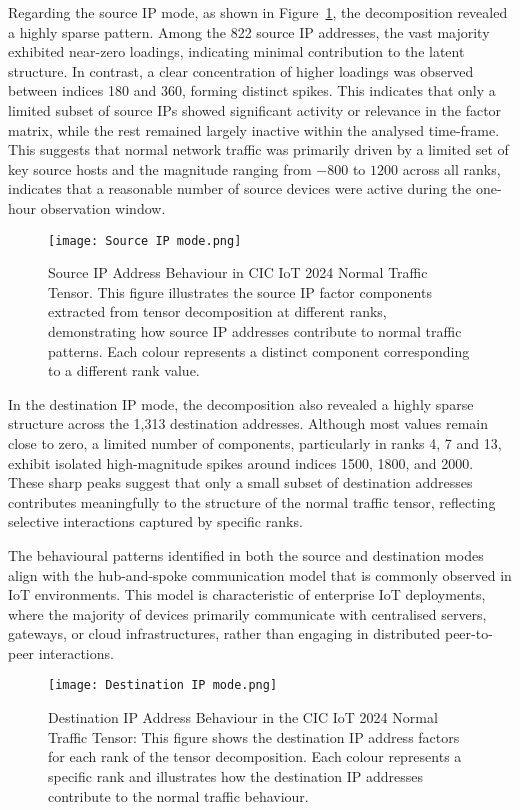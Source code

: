 \documentclass[preprint,12pt,authoryear]{elsarticle}
\begin{document}
Regarding the source IP mode, as shown in Figure~\ref{fig:source_IP}, the decomposition revealed a highly sparse pattern. Among the 822 source IP addresses, the vast majority exhibited near-zero loadings, indicating minimal contribution to the latent structure. In contrast, a clear concentration of higher loadings was observed between indices 180 and 360, forming distinct spikes. This indicates that only a limited subset of source IPs showed significant activity or relevance in the factor matrix, while the rest remained largely inactive within the analysed time-frame. This suggests that normal network traffic was primarily driven by a limited set of key source hosts and the magnitude ranging from $-800$ to $1200$ across all ranks, indicates that a reasonable number of source devices were active during the one-hour observation window.


\begin{figure}[H]
    \centering    \texttt{[image: Source IP mode.png]}
    \caption{Source IP Address Behaviour in CIC IoT 2024 Normal Traffic Tensor.
This figure illustrates the source IP factor components extracted from tensor decomposition at different ranks, demonstrating how source IP addresses contribute to normal traffic patterns. Each colour represents a distinct component corresponding to a different rank value.}
    \label{fig:source_IP}
\end{figure}

In the destination IP mode, the decomposition also revealed a highly sparse structure across the 1,313 destination addresses. Although most values remain close to zero, a limited number of components, particularly in ranks 4, 7 and 13, exhibit isolated high-magnitude spikes around indices 1500, 1800, and 2000. These sharp peaks suggest that only a small subset of destination addresses contributes meaningfully to the structure of the normal traffic tensor, reflecting selective interactions captured by specific ranks.

The behavioural patterns identified in both the source and destination modes align with the hub-and-spoke communication model that is commonly observed in IoT environments. This model is characteristic of enterprise IoT deployments, where the majority of devices primarily communicate with centralised servers, gateways, or cloud infrastructures, rather than engaging in distributed peer-to-peer interactions.


\begin{figure}[H]
    \centering
    \texttt{[image: Destination IP mode.png]}
   \caption{Destination IP Address Behaviour in the CIC IoT 2024 Normal Traffic Tensor: This figure shows the destination IP address factors for each rank of the tensor decomposition. Each colour represents a specific rank and illustrates how the destination IP addresses contribute to the normal traffic behaviour.}
\end{figure}
\end{document}
